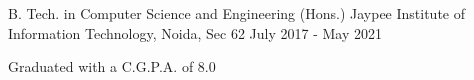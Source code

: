 

\begin{cventries}

  \cventry
    {B. Tech. in Computer Science and Engineering (Hons.)} %
    {Jaypee Institute of Information Technology,} %
    {Noida, Sec 62} %
    {July 2017 - May 2021} %
    {
      \begin{cvitems} %
        \item {Graduated with a C.G.P.A. of 8.0}
      \end{cvitems}
    }

\end{cventries}
